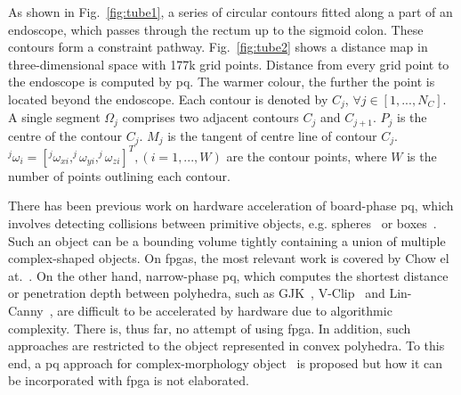 As shown in Fig.~\ref{fig:tube1}, a series of circular contours fitted along a part of an endoscope, which passes through the rectum up to the sigmoid colon. 
These contours form a constraint pathway. 
Fig.~\ref{fig:tube2} shows a distance map in three-dimensional space with 177k grid points. 
Distance from every grid point to the endoscope is computed by \gls{pq}. 
The warmer colour, the further the point is located beyond the endoscope.
Each contour is denoted by $C_j$, $\forall j \in [1,...,N_C]$.
A single segment $\Omega_j$ comprises two adjacent contours $C_j$ and $C_{j+1}$.
$P_j$ is the centre of the contour $C_j$.
$M_j$ is the tangent of centre line of contour $C_j$.
$^j\omega_i=[^j\omega_{xi},^j\omega_{yi},^j\omega_{zi}]^T, (i=1,...,W)$ are the contour points,
where $W$ is the number of points outlining each contour.

There has been previous work on hardware acceleration of board-phase \gls{pq}, which involves detecting collisions between primitive objects, e.g. spheres~\cite{benallegue09} or boxes~\cite{zhang07}. 
Such an object can be a bounding volume tightly containing a union of multiple complex-shaped objects. 
On \glspl{fpga}, the most relevant work is covered by Chow el at.~\cite{chow11}.
On the other hand, narrow-phase \gls{pq}, which computes the shortest distance or penetration depth between polyhedra, such as GJK~\cite{gilbert88}, V-Clip~\cite{mirtich98} and Lin-Canny~\cite{lin91}, are difficult to be accelerated by hardware due to algorithmic complexity. 
There is, thus far, no attempt of using \gls{fpga}. 
In addition, such approaches are restricted to the object represented in convex polyhedra. 
To this end, a \gls{pq} approach for complex-morphology object~\cite{kwok13} is proposed but how it can be incorporated with \gls{fpga} is not elaborated.

